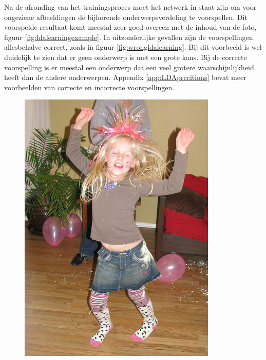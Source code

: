 Na de afronding van het trainingsproces moet het netwerk in staat zijn om voor ongeziene afbeeldingen de bijhorende onderwerpsverdeling te voorspellen. Dit voorspelde resultaat komt meestal zeer goed overeen met de inhoud van de foto, figuur \ref{fig:ldalearningexample}. In uitzonderlijke gevallen zijn de voorspellingen allesbehalve correct, zoals in figuur \ref{fig:wrongldalearning}. Bij dit voorbeeld is wel duidelijk te zien dat er geen onderwerp is met een grote kans. Bij de correcte voorspelling is er meestal een onderwerp dat een veel grotere waarschijnlijkheid heeft dan de andere onderwerpen. Appendix \ref{app:LDAprecitions} bevat meer voorbeelden van correcte en incorrecte voorspellingen.

\begin{figure}[h]
    \centering
    \begin{minipage}[t]{.5\linewidth}
    \centering
    \vspace{0pt}
    \includegraphics[width=\textwidth]{Images/LDA/2282260240.jpg}

\end{minipage}
\end{figure}
